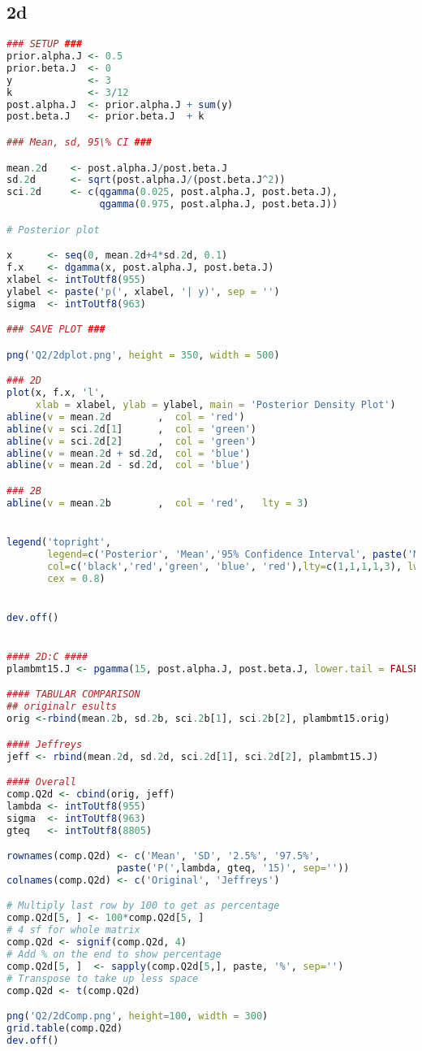 \documentclass{article}
\begin{document}
\subsection{2d} \label{appA2d}
\begin{lstlisting}[language=R]
### SETUP ###
prior.alpha.J <- 0.5
prior.beta.J  <- 0
y             <- 3
k             <- 3/12
post.alpha.J  <- prior.alpha.J + sum(y)
post.beta.J   <- prior.beta.J  + k

### Mean, sd, 95\% CI ###

mean.2d    <- post.alpha.J/post.beta.J
sd.2d      <- sqrt(post.alpha.J/(post.beta.J^2))
sci.2d     <- c(qgamma(0.025, post.alpha.J, post.beta.J), 
                qgamma(0.975, post.alpha.J, post.beta.J))

# Posterior plot

x      <- seq(0, mean.2d+4*sd.2d, 0.1)
f.x    <- dgamma(x, post.alpha.J, post.beta.J)
xlabel <- intToUtf8(955)
ylabel <- paste('p(', xlabel, '| y)', sep = '')
sigma  <- intToUtf8(963)

### SAVE PLOT ###

png('Q2/2dplot.png', height = 350, width = 500)

### 2D
plot(x, f.x, 'l', 
     xlab = xlabel, ylab = ylabel, main = 'Posterior Density Plot')
abline(v = mean.2d        ,  col = 'red')
abline(v = sci.2d[1]      ,  col = 'green')
abline(v = sci.2d[2]      ,  col = 'green')
abline(v = mean.2d + sd.2d,  col = 'blue')
abline(v = mean.2d - sd.2d,  col = 'blue')

### 2B
abline(v = mean.2b        ,  col = 'red',   lty = 3)


legend('topright',
       legend=c('Posterior', 'Mean','95% Confidence Interval', paste('Mean +-', sigma), 'Mean (2b)'),
       col=c('black','red','green', 'blue', 'red'),lty=c(1,1,1,1,3), lwd = 2,
       cex = 0.8)


dev.off()


#### 2D:C ####
plambmt15.J <- pgamma(15, post.alpha.J, post.beta.J, lower.tail = FALSE)

#### TABULAR COMPARISON
## originalr esults
orig <-rbind(mean.2b, sd.2b, sci.2b[1], sci.2b[2], plambmt15.orig)

#### Jeffreys
jeff <- rbind(mean.2d, sd.2d, sci.2d[1], sci.2d[2], plambmt15.J)

#### Overall
comp.Q2d <- cbind(orig, jeff)
lambda <- intToUtf8(955)
sigma  <- intToUtf8(963)
gteq   <- intToUtf8(8805)

rownames(comp.Q2d) <- c('Mean', 'SD', '2.5%', '97.5%', 
                   paste('P(',lambda, gteq, '15)', sep=''))
colnames(comp.Q2d) <- c('Original', 'Jeffreys')

# Multiply last row by 100 to get as percentage
comp.Q2d[5, ] <- 100*comp.Q2d[5, ]
# 4 sf for whole matrix
comp.Q2d <- signif(comp.Q2d, 4)
# Add % on the end to show percentage
comp.Q2d[5, ]  <- sapply(comp.Q2d[5,], paste, '%', sep='')
# Transpose to take up less space
comp.Q2d <- t(comp.Q2d)

png('Q2/2dComp.png', height=100, width = 300)
grid.table(comp.Q2d)
dev.off()
\end{lstlisting}
\end{document}
